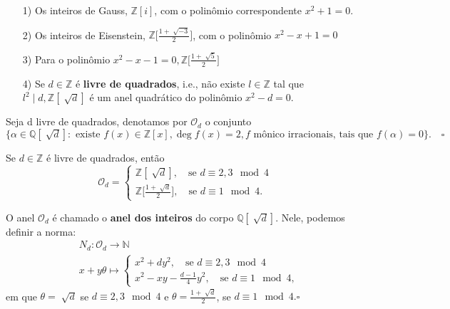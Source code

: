 \documentclass[AlgebraII/algebraII_notes.tex]{subfiles}
\begin{document}
\begin{example}
	\begin{itemize}
		\item[1)] Os inteiros de Gauss, \(\mathbb{Z}[i]\), com o polinômio correspondente \(x^{2} + 1 = 0\).
		\item[2)] Os inteiros de Eisenstein, \(\mathbb{Z}\biggl[\frac{1+\sqrt[]{-3}}{2}\biggr]\), com o polinômio \(x^{2} - x + 1 = 0\)
		\item[3)] Para o polinômio \(x^{2} - x - 1 = 0, \mathbb{Z}\biggl[\frac{1 + \sqrt[]{5}}{2}\biggr]\)
		\item[4)] Se \(d\in \mathbb{Z}\) é \textbf{livre de quadrados}, i.e., não existe \(l\in \mathbb{Z}\)
		      tal que \(l^{2}\mid d, \mathbb{Z}[\sqrt[]{d}]\) é um anel quadrático do polinômio \(x^{2} - d = 0.\)
	\end{itemize}
\end{example}
\begin{def*}
	Seja d livre de quadrados, denotamos por \(\mathcal{O}_{d}\) o conjunto
	\(\{\alpha \in \mathbb{Q}[\sqrt[]{d}]:\text{ existe }f(x)\in \mathbb{Z}[x], \deg{f(x)} = 2, f \text{ mônico irracionais, tais que } f(\alpha)=0\}.\quad\square\)
\end{def*}
\begin{theorem*}
	Se \(d\in \mathbb{Z}\) é livre de quadrados, então
	\[
		\mathcal{O}_{d} = \left\{\begin{array}{ll}
			\mathbb{Z}[\sqrt[]{d}],\quad\text{se } d\equiv 2, 3 \mod{4} \\
			\mathbb{Z}\biggl[\frac{1+\sqrt[]{d}}{2}\biggr],\quad\text{se } d\equiv 1\mod{4}.
		\end{array}\right.
	\]
\end{theorem*}
\begin{def*}
	O anel \(\mathcal{O}_{d}\) é chamado o \textbf{anel dos inteiros} do corpo \(\mathbb{Q}[\sqrt[]{d}].\) Nele,
	podemos definir a norma:
	\begin{align*}
		 & N_{d}:\mathcal{O}_{d}\rightarrow \mathbb{N}                                              \\
		 & x+y\theta \mapsto \left\{\begin{array}{ll}
			                            x^{2} + dy^{2},\quad \text{se } d\equiv2,3\mod{4} \\
			                            x^{2} - xy - \frac{d-1}{4}y^{2},\quad\text{se } d\equiv1\mod{4},
		                            \end{array}\right.
	\end{align*}
	em que \(\theta = \sqrt[]{d}\) se \(d\equiv 2, 3\mod{4}\) e \(\theta = \frac{1+\sqrt[]{d}}{2}\), se \(d\equiv 1\mod{4}.\square\)
\end{def*}
\end{document}
